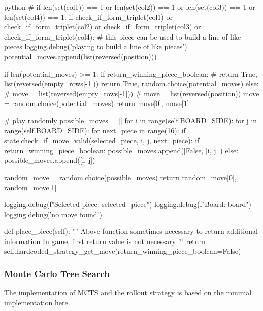 \begin{mintedbox}{python}
                    # if len(set(col1)) == 1 or len(set(col2)) == 1 or len(set(col3)) == 1 or len(set(col4)) == 1:
                    if check_if_form_triplet(col1) or check_if_form_triplet(col2) or check_if_form_triplet(col3) or check_if_form_triplet(col4):
                        # this piece can be used to build a line of like pieces
                        logging.debug('playing to build a line of like pieces')
                        potential_moves.append(list(reversed(position)))

                    if len(potential_moves) >= 1:
                        if return_winning_piece_boolean:
                            # return True, list(reversed(empty_rows[-1]))
                            return True, random.choice(potential_moves)
                        else:
                            # move = list(reversed(empty_rows[-1]))
                            # move = list(reversed(position))
                            move = random.choice(potential_moves)
                            return move[0], move[1]

        # play randomly
        possible_moves = []
        for i in range(self.BOARD_SIDE):
            for j in range(self.BOARD_SIDE):
                for next_piece in range(16):
                    if state.check_if_move_valid(selected_piece, i, j, next_piece):
                        if return_winning_piece_boolean:
                            possible_moves.append([False, [i, j]])
                        else:
                            possible_moves.append([i, j])

        random_move = random.choice(possible_moves)
        return random_move[0], random_move[1]

        logging.debug(f"Selected piece: {selected_piece}")
        logging.debug(f"Board: {board}")
        logging.debug('no move found')

    def place_piece(self):
        '''
        Above function sometimes necessary to return additional information
        In game, first return value is not necessary
        '''
        return self.hardcoded_strategy_get_move(return_winning_piece_boolean=False)
\end{mintedbox}

\subsubsection{Monte Carlo Tree Search}

The implementation of MCTS and the rollout strategy is based on the minimal implementation \href{https://gist.github.com/qpwo/c538c6f73727e254fdc7fab81024f6e1}{here}.

